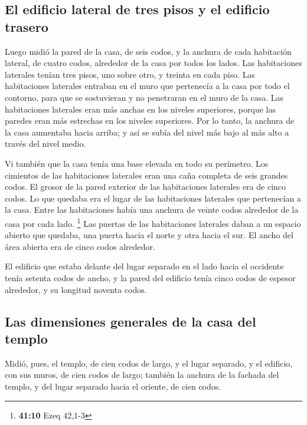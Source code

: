 \begin{paracol}{2}
\hypertarget{el-edificio-lateral-de-tres-pisos-y-el-edificio-trasero}{%
\subsection{El edificio lateral de tres pisos y el edificio
trasero}\label{el-edificio-lateral-de-tres-pisos-y-el-edificio-trasero}}

 Luego midió la pared de la casa, de seis codos, y la
anchura de cada habitación lateral, de cuatro codos, alrededor de la
casa por todos los lados.  Las habitaciones laterales
tenían tres pisos, uno sobre otro, y treinta en cada piso. Las
habitaciones laterales entraban en el muro que pertenecía a la casa por
todo el contorno, para que se sostuvieran y no penetraran en el muro de
la casa.  Las habitaciones laterales eran más anchas en
los niveles superiores, porque las paredes eran más estrechas en los
niveles superiores. Por lo tanto, la anchura de la casa aumentaba hacia
arriba; y así se subía del nivel más bajo al más alto a través del nivel
medio.

 Vi también que la casa tenía una base elevada en todo su
perímetro. Los cimientos de las habitaciones laterales eran una caña
completa de seis grandes codos.  El grosor de la pared
exterior de las habitaciones laterales era de cinco codos. Lo que
quedaba era el lugar de las habitaciones laterales que pertenecían a la
casa.  Entre las habitaciones había una anchura de veinte
codos alrededor de la casa por cada lado. \footnote{\textbf{41:10} Ezeq
  42,1-3}  Las puertas de las habitaciones laterales
daban a un espacio abierto que quedaba, una puerta hacia el norte y otra
hacia el sur. El ancho del área abierta era de cinco codos alrededor.

 El edificio que estaba delante del lugar separado en el
lado hacia el occidente tenía setenta codos de ancho, y la pared del
edificio tenía cinco codos de espesor alrededor, y su longitud noventa
codos.

\hypertarget{las-dimensiones-generales-de-la-casa-del-templo}{%
\subsection{Las dimensiones generales de la casa del
templo}\label{las-dimensiones-generales-de-la-casa-del-templo}}

 Midió, pues, el templo, de cien codos de largo, y el
lugar separado, y el edificio, con sus muros, de cien codos de largo;
 también la anchura de la fachada del templo, y del lugar
separado hacia el oriente, de cien codos.


\end{paracol}
